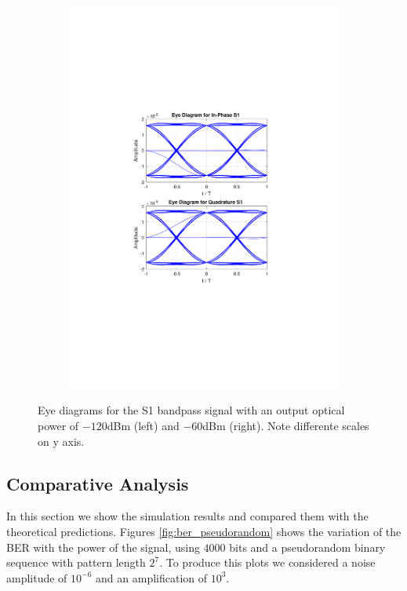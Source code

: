 \begin{figure}
\begin{subfigure}{.5\textwidth}
		\includegraphics[clip, trim=4cm 8cm 4cm 8cm, width=\textwidth]{./sdf/m_qam_system/figures/eye_diagram_S1_60.pdf}
	\end{subfigure}
	\caption{Eye diagrams for the S1 bandpass signal with an output optical power of $-120$dBm (left) and $-60$dBm (right). Note differente scales on y axis.}
	\label{fig:test}
\end{figure}

\subsection{Comparative Analysis}

In this section we show the simulation results and compared them with the theoretical predictions. Figures \ref{fig:ber_pseudorandom} shows the variation of the BER with the power of the signal, using $4000$ bits and a pseudorandom binary sequence with pattern length $2^7$. To produce this plots we considered a noise amplitude of $10^{-6}$ and an amplification of $10^3$.

